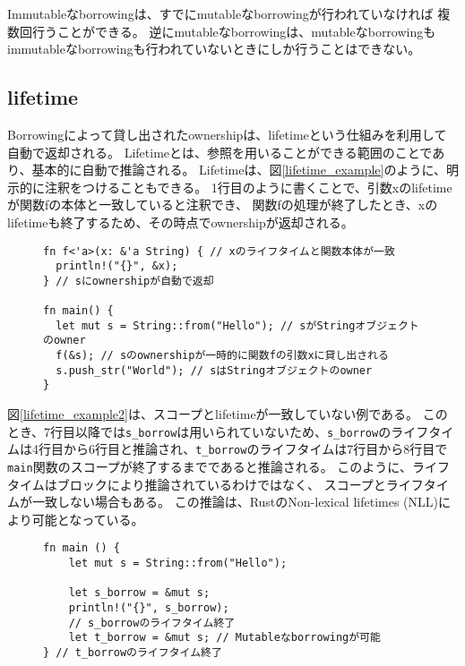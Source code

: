 \documentclass{sumiilab-paper}
\theoremstyle{mystyle}
\numberwithin{definition}{chapter} %
\begin{document}
Immutableなborrowingは、すでにmutableなborrowingが行われていなければ
複数回行うことができる。
逆にmutableなborrowingは、mutableなborrowingも
immutableなborrowingも行われていないときにしか行うことはできない。

\subsection{lifetime}
Borrowingによって貸し出されたownershipは、lifetimeという仕組みを利用して自動で返却される。
Lifetimeとは、参照を用いることができる範囲のことであり、基本的に自動で推論される。
Lifetimeは、図\ref{lifetime_example}のように、明示的に注釈をつけることもできる。
1行目のように書くことで、引数xのlifetimeが関数fの本体と一致していると注釈でき、
関数fの処理が終了したとき、xのlifetimeも終了するため、その時点でownershipが返却される。
\begin{figure}[htp]
\begin{lstlisting}[caption=Lifetime注釈, label=lifetime_example, captionpos=b]
fn f<'a>(x: &'a String) { // xのライフタイムと関数本体が一致
  println!("{}", &x);
} // sにownershipが自動で返却

fn main() {
  let mut s = String::from("Hello"); // sがStringオブジェクトのowner
  f(&s); // sのownershipが一時的に関数fの引数xに貸し出される
  s.push_str("World"); // sはStringオブジェクトのowner
}
\end{lstlisting}
\end{figure}

図\ref{lifetime_example2}は、スコープとlifetimeが一致していない例である。
このとき、7行目以降では\texttt{s\_borrow}は用いられていないため、\texttt{s\_borrow}のライフタイムは4行目から6行目と推論され、\texttt{t\_borrow}のライフタイムは7行目から8行目で\texttt{main}関数のスコープが終了するまでであると推論される。
このように、ライフタイムはブロックにより推論されているわけではなく、
スコープとライフタイムが一致しない場合もある。
この推論は、RustのNon-lexical lifetimes (NLL)\cite{nll}により可能となっている。
\begin{figure}[htp]
\begin{lstlisting}[caption=スコープとlifetimeが一致していない例, label=lifetime_example2, captionpos=b]
fn main () {
    let mut s = String::from("Hello");

    let s_borrow = &mut s;
    println!("{}", s_borrow);
    // s_borrowのライフタイム終了
    let t_borrow = &mut s; // Mutableなborrowingが可能
} // t_borrowのライフタイム終了
\end{lstlisting}
\end{figure}
\end{document}
